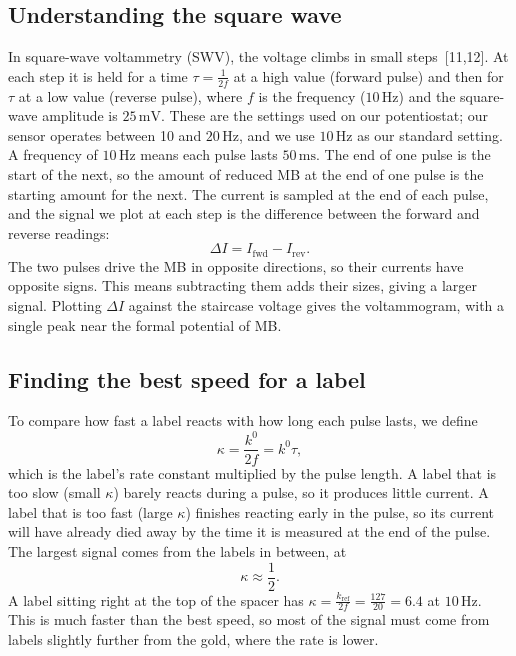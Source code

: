 \documentclass[10pt,a4paper]{article}
\numberwithin{equation}{section}
\newcommand{\cit}[1]{[#1]}
\newcommand{\kref}{k_{\mathrm{ref}}}
\begin{document}
\subsection{Understanding the square wave}
In square-wave voltammetry (SWV), the voltage climbs in small steps~\cit{11,12}. At each step it is held for a time $\tau = \frac{1}{2f}$ at a high value (forward pulse) and then for $\tau$ at a low value (reverse pulse), where $f$ is the frequency ($10\,\mathrm{Hz}$) and the square-wave amplitude is $25\,\mathrm{mV}$. These are the settings used on our potentiostat; our sensor operates between 10 and $20\,\mathrm{Hz}$, and we use $10\,\mathrm{Hz}$ as our standard setting. A frequency of $10\,\mathrm{Hz}$ means each pulse lasts $50\,\mathrm{ms}$. The end of one pulse is the start of the next, so the amount of reduced MB at the end of one pulse is the starting amount for the next. The current is sampled at the end of each pulse, and the signal we plot at each step is the difference between the forward and reverse readings:
\[ \Delta I = I_{\mathrm{fwd}} - I_{\mathrm{rev}}. \]
The two pulses drive the MB in opposite directions, so their currents have opposite signs. This means subtracting them adds their sizes, giving a larger signal. Plotting $\Delta I$ against the staircase voltage gives the voltammogram, with a single peak near the formal potential of MB.

\subsection{Finding the best speed for a label}
To compare how fast a label reacts with how long each pulse lasts, we define
\[ \kappa = \frac{k^0}{2f} = k^0\tau, \]
which is the label's rate constant multiplied by the pulse length. A label that is too slow (small $\kappa$) barely reacts during a pulse, so it produces little current. A label that is too fast (large $\kappa$) finishes reacting early in the pulse, so its current will have already died away by the time it is measured at the end of the pulse. The largest signal comes from the labels in between, at
\[ \kappa \approx \frac12. \]
A label sitting right at the top of the spacer has $\kappa = \frac{\kref}{2f} = \frac{127}{20} = 6.4$ at $10\,\mathrm{Hz}$. This is much faster than the best speed, so most of the signal must come from labels slightly further from the gold, where the rate is lower.
\end{document}
